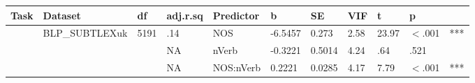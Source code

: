 \begin{table}[ht]
\centering
\begingroup\normalsize
\begin{tabular}{lllllllllll}
  \hline
Task & Dataset & df & adj.r.sq & Predictor & b & SE & VIF & t & p &  \\ 
  \hline
 & BLP\_SUBTLEXuk & 5191 & .14 & NOS & -6.5457 & 0.273 & 2.58 & 23.97 & $<$.001 & *** \\ 
   &  &  & NA & nVerb & -0.3221 & 0.5014 & 4.24 & .64 & .521 &   \\ 
   &  &  & NA & NOS:nVerb & 0.2221 & 0.0285 & 4.17 & 7.79 & $<$.001 & *** \\ 
   \hline
\end{tabular}
\endgroup
\end{table}
